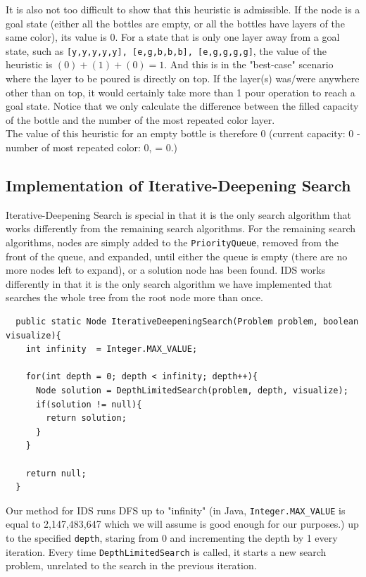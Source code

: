 \documentclass{article}
\begin{document}
It is also not too difficult to show that this heuristic is admissible. If the node is a goal state (either all the bottles are empty, or all the bottles have layers of the same color), its value is 0. For a state that is only one layer away from a goal state, such as \texttt{[y,y,y,y,y], [e,g,b,b,b], [e,g,g,g,g]}, the value of the heuristic is $(0) + (1) + (0) = 1$. And this is in the "best-case" scenario where the layer to be poured is directly on top. If the layer(s) was/were anywhere other than on top, it would certainly take more than 1 pour operation to reach a goal state. Notice that we only calculate the difference between the filled capacity of the bottle and the number of the most repeated color layer. \\

The value of this heuristic for an empty bottle is therefore 0 (current capacity: 0 - number of most repeated color: 0, = 0.)



\subsection{Implementation of Iterative-Deepening Search}

Iterative-Deepening Search is special in that it is the only search algorithm that works differently from the remaining search algorithms. For the remaining search algorithms, nodes are simply added to the \texttt{PriorityQueue}, removed from the front of the queue, and expanded, until either the queue is empty (there are no more nodes left to expand), or a solution node has been found. IDS works differently in that it is the only search algorithm we have implemented that searches the whole tree from the root node more than once.

\begin{verbatim}
  public static Node IterativeDeepeningSearch(Problem problem, boolean visualize){
    int infinity  = Integer.MAX_VALUE;

    for(int depth = 0; depth < infinity; depth++){
      Node solution = DepthLimitedSearch(problem, depth, visualize);
      if(solution != null){
        return solution;
      }
    }

    return null;
  }
\end{verbatim}

Our method for IDS runs DFS up to "infinity" (in Java, \texttt{Integer.MAX\_VALUE} is equal to 2,147,483,647 which we will assume is good enough for our purposes.) up to the specified \texttt{depth}, staring from 0 and incrementing the depth by 1 every iteration. Every time \texttt{DepthLimitedSearch} is called, it starts a new search problem, unrelated to the search in the previous iteration. \\
\end{document}
